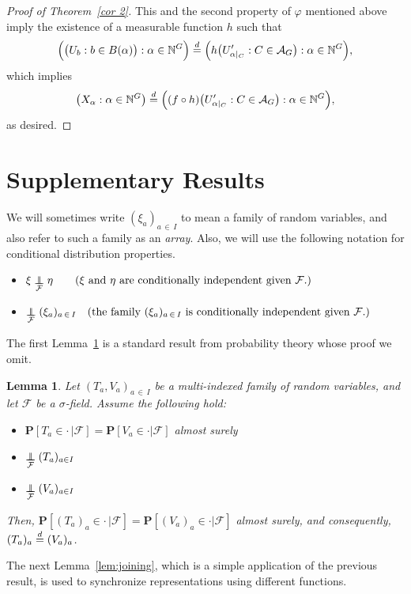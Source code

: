 \documentclass[10pt]{amsart}
\newtheorem{lemm}[theo]{Lemma}\newtheorem{prop}[theo]{Proposition}\newtheorem{coro}[theo]{Corollary}\newtheorem{conj}[theo]{Conjecture}
\theoremstyle{definition}\newtheorem{defi}[theo]{Definition}\newtheorem{rema}[theo]{Remark}\newtheorem{exam}[theo]{Example}\newtheorem{exem}[theo]{Example}\newtheorem{nota}[theo]{Notation}
\newcommand{\independent}{\protect\mathpalette{\protect\independenT}{\perp}}\def\independenT#1#2{\mathrel{\rlap{$#1#2$}\mkern2mu{#1#2}}}
\newcommand{\indices}[1]{\mathbb{N}^{#1}}
\renewcommand{\d}{\buildrel{d}\over{=}}
\newcommand*\N{\mathbb{N}}
\renewcommand{\AA}{\mathcal{A}}
\newcommand*\FF{\mathcal{F}}
\newcommand{\Pbf}{\mathbf{P}}%
\begin{document}
\begin{proof}[Proof of Theorem~\ref{cor 2}]
\goodbreak
This and the second property of $\varphi$ mentioned above imply the existence of a measurable function $h$ such that
\[
\Big(\big(U_b : b \in B(\alpha)\big) : \alpha \in \N^G\Big)
\d \Big(h\big(U'_{\alpha|_C} : C \in \AA_G\big) : \alpha \in \N^G\Big),
\]
which implies
\[
\left(X_\alpha : \alpha \in \indices G\right) \d \Big((f \circ h)\big(U'_{\alpha|_C} : C \in \AA_G\big) : \alpha \in \indices G\Big),
\]
as desired.
\end{proof}

\section{Supplementary Results}\label{App: supplementary}
We will sometimes write $(\xi_a)_{a\,\in\,I}$ to mean a family of random variables, and also refer to such a family as an \emph{array}. Also, we will use the following notation for conditional distribution properties.
\begin{itemize}
\item $\xi \underset{\mathcal{F}}{\independent} \eta \qquad (\xi \text{ and }\eta\text{ are conditionally independent given }\mathcal{F}.)$
\item $\underset{\mathcal{F}}{\independent}(\xi_a)_{a\,\in\,I} \quad (\text{the family }(\xi_a)_{a\,\in\,I}\text{ is conditionally independent given }\FF.)$
\end{itemize}

The first Lemma~\ref{lem:Identification} is a standard result from probability theory whose proof we omit.

\begin{lemm}\label{lem:Identification}
Let $(T_a, V_a)_{a\,\in\,I}$ be a multi-indexed family of random variables, and let $\mathcal{F}$ be a $\sigma$-field. Assume the following hold:
\begin{itemize}
\item $\Pbf[T_a \in \cdot\,| \FF]= \Pbf[V_a \in \cdot | \FF]$ almost surely
\item $\underset{\mathcal{F}}{\independent}(T_a)_{a\in I} $
\item $\underset{\mathcal{F}}{\independent}(V_a)_{a\in I} $
\end{itemize}
Then, $\Pbf[(T_a)_a \in \cdot\,| \FF] = \Pbf[(V_a)_a \in \cdot | \FF]$ almost surely, and consequently, $(T_a)_a \d (V_a)_a$.
\end{lemm}

The next Lemma~\ref{lem:joining}, which is a simple application of the previous result, is used to synchronize representations using different functions.
\end{document}
